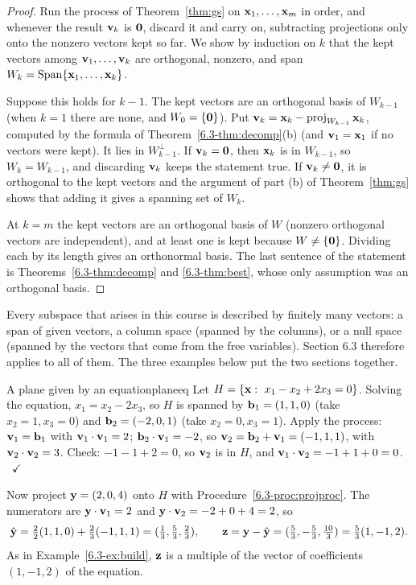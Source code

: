 \documentclass[11pt]{article}
\begin{document}
\begin{proof}
Run the process of Theorem~\ref{thm:gs} on $\mathbf{x}_1,\dots,\mathbf{x}_m$ in order, and whenever the result $\mathbf{v}_k$ is $\mathbf{0}$, discard it and carry on, subtracting projections only onto the nonzero vectors kept so far. We show by induction on $k$ that the kept vectors among $\mathbf{v}_1,\dots,\mathbf{v}_k$ are orthogonal, nonzero, and span $W_k=\operatorname{Span}\{\mathbf{x}_1,\dots,\mathbf{x}_k\}$.

Suppose this holds for $k-1$. The kept vectors are an orthogonal basis of $W_{k-1}$ (when $k=1$ there are none, and $W_0=\{\mathbf{0}\}$). Put $\mathbf{v}_k=\mathbf{x}_k-\operatorname{proj}_{W_{k-1}}\mathbf{x}_k$, computed by the formula of Theorem~\ref{6.3-thm:decomp}(b) (and $\mathbf{v}_1=\mathbf{x}_1$ if no vectors were kept). It lies in $W_{k-1}^{\perp}$. If $\mathbf{v}_k=\mathbf{0}$, then $\mathbf{x}_k$ is in $W_{k-1}$, so $W_k=W_{k-1}$, and discarding $\mathbf{v}_k$ keeps the statement true. If $\mathbf{v}_k\neq\mathbf{0}$, it is orthogonal to the kept vectors and the argument of part (b) of Theorem~\ref{thm:gs} shows that adding it gives a spanning set of $W_k$.

At $k=m$ the kept vectors are an orthogonal basis of $W$ (nonzero orthogonal vectors are independent), and at least one is kept because $W\neq\{\mathbf{0}\}$. Dividing each by its length gives an orthonormal basis. The last sentence of the statement is Theorems~\ref{6.3-thm:decomp} and \ref{6.3-thm:best}, whose only assumption was an orthogonal basis.
\end{proof}

Every subspace that arises in this course is described by finitely many vectors: a span of given vectors, a column space (spanned by the columns), or a null space (spanned by the vectors that come from the free variables). Section 6.3 therefore applies to all of them. The three examples below put the two sections together.

\begin{exmp}{A plane given by an equation}{planeeq}
Let $H=\{\mathbf{x}:\ x_1-x_2+2x_3=0\}$. Solving the equation, $x_1=x_2-2x_3$, so $H$ is spanned by $\mathbf{b}_1=(1,1,0)$ (take $x_2=1,x_3=0$) and $\mathbf{b}_2=(-2,0,1)$ (take $x_2=0,x_3=1$). Apply the process: $\mathbf{v}_1=\mathbf{b}_1$ with $\mathbf{v}_1\cdot\mathbf{v}_1=2$; $\mathbf{b}_2\cdot\mathbf{v}_1=-2$, so $\mathbf{v}_2=\mathbf{b}_2+\mathbf{v}_1=(-1,1,1)$, with $\mathbf{v}_2\cdot\mathbf{v}_2=3$. Check: $-1-1+2=0$, so $\mathbf{v}_2$ is in $H$, and $\mathbf{v}_1\cdot\mathbf{v}_2=-1+1+0=0$. \ $\checkmark$

Now project $\mathbf{y}=(2,0,4)$ onto $H$ with Procedure~\ref{6.3-proc:projproc}. The numerators are $\mathbf{y}\cdot\mathbf{v}_1=2$ and $\mathbf{y}\cdot\mathbf{v}_2=-2+0+4=2$, so
\[
\hat{\mathbf{y}}=\tfrac22(1,1,0)+\tfrac23(-1,1,1)=(\tfrac13,\tfrac53,\tfrac23),\qquad\mathbf{z}=\mathbf{y}-\hat{\mathbf{y}}=(\tfrac53,-\tfrac53,\tfrac{10}3)=\tfrac53(1,-1,2).
\]
As in Example~\ref{6.3-ex:build}, $\mathbf{z}$ is a multiple of the vector of coefficients $(1,-1,2)$ of the equation.
\end{exmp}
\end{document}
